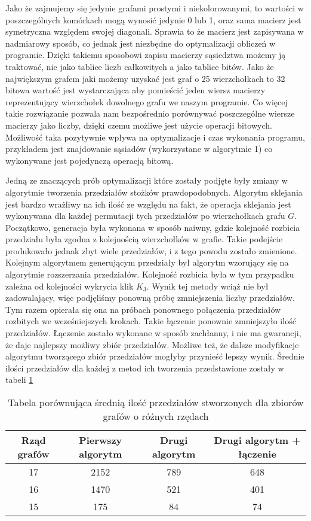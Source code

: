 Jako że zajmujemy się jedynie grafami prostymi i niekolorowanymi, to wartości w poszczególnych komórkach mogą wynosić jedynie 0 lub 1, oraz sama macierz jest symetryczna względem swojej diagonali. Sprawia to że macierz jest zapisywana w nadmiarowy sposób, co jednak jest niezbędne do optymalizacji obliczeń w programie. Dzięki takiemu sposobowi zapisu macierzy sąsiedztwa możemy ją traktować, nie jako tablice liczb całkowitych a jako tablice bitów. Jako że największym grafem jaki możemy uzyskać jest graf o 25 wierzchołkach to 32 bitowa wartość jest wystarczająca aby pomieścić jeden wiersz macierzy reprezentujący wierzchołek dowolnego grafu we naszym programie. Co więcej takie rozwiązanie pozwala nam bezpośrednio porównywać poszczególne wiersze macierzy jako liczby, dzięki czemu możliwe jest użycie operacji bitowych. Możliwość taka pozytywnie wpływa na optymalizacje i czas wykonania programu, przykładem jest znajdowanie sąsiadów (wykorzystane w algorytmie 1) co wykonywane jest pojedynczą operacją bitową.

Jedną ze znaczących prób optymalizacji które zostały podjęte były zmiany w algorytmie tworzenia przedziałów stożków prawdopodobnych. Algorytm sklejania jest bardzo wrażliwy na ich ilość ze względu na fakt, że operacja sklejania jest wykonywana dla każdej permutacji tych przedziałów po wierzchołkach grafu $G$. Początkowo, generacja była wykonana w sposób naiwny, gdzie kolejność rozbicia przedziału była zgodna z kolejnością wierzchołków w grafie. Takie podejście produkowało jednak zbyt wiele przedziałów, i z tego powodu zostało zmienione. Kolejnym algorytmem generującym przedziały był algorytm wzorujący się na algorytmie rozszerzania przedziałów. Kolejność rozbicia była w tym przypadku zależna od kolejności wykrycia klik $K_3$. Wynik tej metody wciąż nie był zadowalający, więc podjęliśmy ponowną próbę zmniejszenia liczby przedziałów. Tym razem opierała się ona na próbach ponownego połączenia przedziałów rozbitych we wcześniejszych krokach. Takie łączenie ponownie zmniejszyło ilość przedziałów. Łączenie zostało wykonane w sposób zachłanny, i nie ma gwarancji, że daje najlepszy możliwy zbiór przedziałów. Możliwe też, że dalsze modyfikacje algorytmu tworzącego zbiór przedziałów mogłyby przynieść lepszy wynik. Średnie ilości przedziałów dla każdej z metod ich tworzenia przedstawione zostały w tabeli \ref{tabPrzedzialy}

 \begin{table}[H]
 \begin{center}
 \begin{tabular}{|c c c c|} 
 \hline
 Rząd grafów & Pierwszy algorytm & Drugi algorytm & Drugi algorytm + łączenie \\ 
 \hline\hline
 17 & 2152 &  789 & 648\\
 \hline
 16 & 1470 & 521 & 401\\
 \hline
 15 & 175 & 84 & 74\\
 \hline
\end{tabular}
\end{center}
 \caption{Tabela porównująca średnią ilość przedziałów stworzonych dla zbiorów grafów o różnych rzędach}
 \label{tabPrzedzialy}
 \end{table}
 
